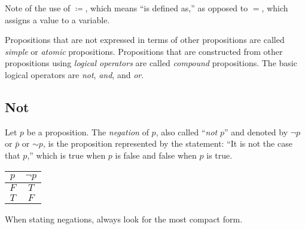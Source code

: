 \documentclass[letterpaper,12pt,fleqn]{article}
\newcommand{\blnot}[1]{\bar{#1}}
\newcommand{\tlnot}{\mathord{\sim}}
\begin{document}
Note of the use of \(\coloneqq\), which means ``is defined as,'' as opposed to \(=\), which assigns a value to a
variable.

\begin{definition}
  Propositions that are not expressed in terms of other propositions are called \emph{simple} or \emph{atomic}
  propositions.  Propositions that are constructed from other propositions using \emph{logical operators} are
  called \emph{compound} propositions.  The basic logical operators are \emph{not}, \emph{and}, and \emph{or}.
\end{definition}

\subsection*{Not}

\begin{definition}[Negation]
  Let \(p\) be a proposition.  The \emph{negation} of \(p\), also called ``\emph{not} \(p\)'' and denoted by
  \(\lnot p\) or \(\blnot{p}\) or \(\tlnot{p}\), is the proposition represented by the statement: ``It is not the
  case that \(p\),'' which is true when \(p\) is false and false when \(p\) is true.

  \begin{center}
    \begin{tabular}{|c|c|}
      \hline
      \(p\) & \(\neg p\) \\
      \hline
      \(F\) & \(T\) \\
      \hline
      \(T\) & \(F\) \\
      \hline
    \end{tabular}
  \end{center}
\end{definition}

When stating negations, always look for the most compact form.
\end{document}
